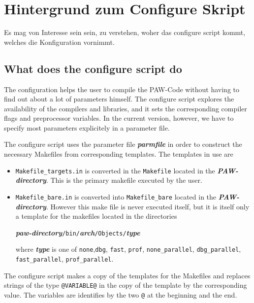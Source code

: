 \documentclass[a4paper,10pt]{report}
\newcommand{\myspec}[1]{\textbf{\textit{#1}}}
\newcommand{\mytt}[1]{{\tt #1}}
\begin{document}
\section{Hintergrund zum Configure Skript}
\label{sec:configurebackground}
Es mag von Interesse sein sein, zu verstehen, woher das configure
script kommt, welches die Konfiguration vornimmt. 

\subsection{What does the configure script do}
The configuration helps the user to compile the PAW-Code without
having to find out about a lot of parameters himself.  The configure
script explores the availability of the compilers and libraries, and
it sets the corresponding compiler flags and preprocessor
variables. In the current version, however, we have to specify most
parameters explicitely in a parameter file.

The configure script uses the parameter file \myspec{parmfile} in
order to construct the necessary Makefiles from corresponding
templates. The templates in use are
\begin{itemize}
\item \mytt{Makefile\_targets.in} is converted in the \mytt{Makefile}
located in the \myspec{PAW-directory}. This is the primary makefile
executed by the user.
\item \mytt{Makefile\_bare.in} is converted into \mytt{Makefile\_bare}
located in the \myspec{PAW-directory}. However this make file is never
executed itself, but it is itself only a template for the makefiles located in the directories
\begin{center}
\myspec{paw-directory}\mytt{/bin/}\myspec{arch}\mytt{/Objects/}\myspec{type}
\end{center}
where \myspec{type} is one of \mytt{none},\mytt{dbg}, \mytt{fast},
\mytt{prof}, \mytt{none\_parallel}, \mytt{dbg\_parallel},
\mytt{fast\_parallel}, \mytt{prof\_parallel}.
\end{itemize}

The configure script makes a copy of the templates for the Makefiles
and replaces strings of the type \mytt{@VARIABLE@} in the copy of the
template by the corresponding value. The variables are identifies by
the two \mytt{@} at the beginning and the end.
\end{document}
